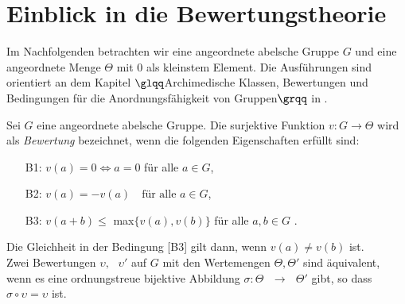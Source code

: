 \section{Einblick in die Bewertungstheorie}
Im Nachfolgenden betrachten wir eine angeordnete abelsche Gruppe $G$ und eine angeordnete Menge $\Theta$ mit $0$ als kleinstem Element. Die Ausführungen sind orientiert an dem Kapitel $\glqq$Archimedische Klassen, Bewertungen und Bedingungen für die Anordnungsfähigkeit von Gruppen$\grqq$ in \cite[S. 9 - 11]{priesscrampe83}.
%
%
\begin{defn} %
Sei $G$ eine angeordnete abelsche Gruppe. Die surjektive Funktion $v\colon G \rightarrow \Theta$ wird als \textit{Bewertung} bezeichnet, wenn die folgenden Eigenschaften erfüllt sind:
%
\begin{enumerate}
\item[B1:] $v{(a)} = 0 \Leftrightarrow a = 0$ für alle $a\in G$,
\item[B2:]  $v{(a)} = -v{(a)} \text{  } \text{ für alle } a \in G $,
\item[B3:] $ v{(a+ b)} \le$ max$\{v{(a)}, v{(b)}\}$ für alle $ a, b \in G$ .
\end{enumerate}
%
\end{defn}
Die Gleichheit in der Bedingung [B3] gilt dann, wenn $v{(a)} \ne v{(b)} $ ist.\\
 Zwei Bewertungen $\upsilon, \text{ } \upsilon' $ auf $G$ mit den Wertemengen $\Theta , \Theta' $ sind äquivalent, wenn es eine ordnungstreue bijektive Abbildung $\sigma \colon \Theta \text{ } \rightarrow \text{ } \Theta' $ gibt, so dass $ \sigma \circ \upsilon = \upsilon  $ ist.\\

